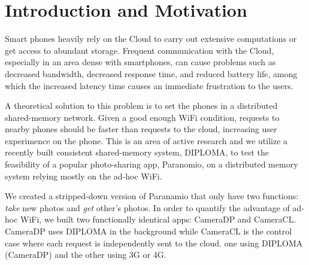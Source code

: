 \chapter{Introduction and Motivation}

Smart phones heavily rely on the Cloud to carry out extensive computations or get access to abundant storage.  Frequent communication with the Cloud, especially in an area dense with smartphones, can cause problems such as decreased bandwidth, decreased response time, and reduced battery life, among which the increased latency time causes an immediate frustration to the users.

A theoretical solution to this problem is to set the phones in a distributed shared-memory network. Given a good enough WiFi condition, requests to nearby phones should be faster than requests to the cloud, increasing user experimence on the phone. This is an area of active research and we utilize a recently built consistent shared-memory system, DIPLOMA, to test the feasibility of a popular photo-sharing app, Paranomio, on a distributed memory system relying mostly on the ad-hoc WiFi.

We created a stripped-down version of Paranamio that only have two functions: {\it take} new photos and {\it get} other's photos. In order to quantify the advantage of ad-hoc WiFi, we built two functionally identical apps: CameraDP and CameraCL. CameraDP uses DIPLOMA in the background while CameraCL is the control case where each request is independently sent to the cloud. one using DIPLOMA (CameraDP) and the other using 3G or 4G.
